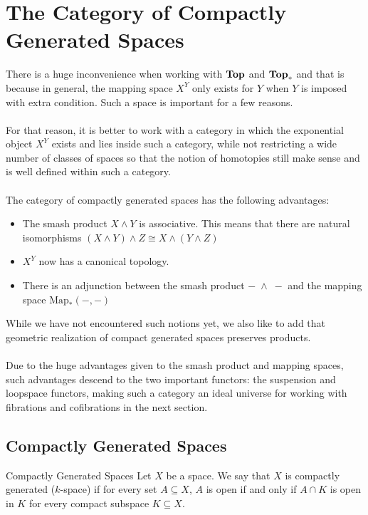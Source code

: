 \documentclass[a4paper]{article}
\begin{document}
\pagebreak
\section{The Category of Compactly Generated Spaces}
There is a huge inconvenience when working with $\bold{Top}$ and $\bold{Top}_\ast$ and that is because in general, the mapping space $X^Y$ only exists for $Y$ when $Y$ is imposed with extra condition. Such a space is important for a few reasons. \\~\\

For that reason, it is better to work with a category in which the exponential object $X^Y$ exists and lies inside such a category, while not restricting a wide number of classes of spaces so that the notion of homotopies still make sense and is well defined within such a category. \\~\\

The category of compactly generated spaces has the following advantages: 
\begin{itemize}
\item The smash product $X\wedge Y$ is associative. This means that there are natural isomorphisms $(X\wedge Y)\wedge Z\cong X\wedge(Y\wedge Z)$
\item $X^Y$ now has a canonical topology. 
\item There is an adjunction between the smash product $-\;\wedge\;-$ and the mapping space $\text{Map}_\ast(-,-)$
\end{itemize}

While we have not encountered such notions yet, we also like to add that geometric realization of compact generated spaces preserves products. \\~\\

Due to the huge advantages given to the smash product and mapping spaces, such advantages descend to the two important functors: the suspension and loopspace functors, making such a category an ideal universe for working with fibrations and cofibrations in the next section. 

\subsection{Compactly Generated Spaces}
\begin{defn}{Compactly Generated Spaces}{} Let $X$ be a space. We say that $X$ is compactly generated ($k$-space) if for every set $A\subseteq X$, $A$ is open if and only if $A\cap K$ is open in $K$ for every compact subspace $K\subseteq X$. 
\end{defn}
\end{document}
